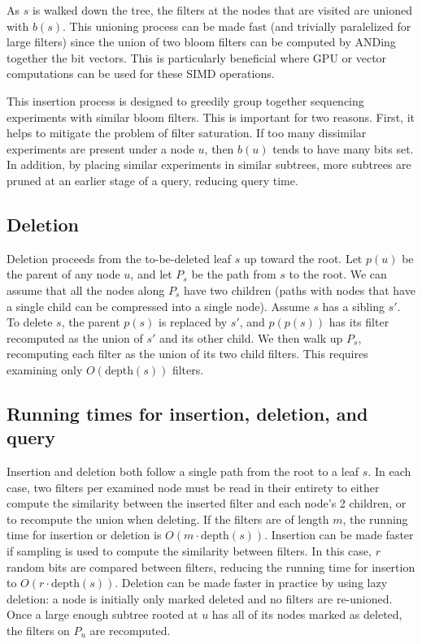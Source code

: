 \documentclass[11pt]{article}
\begin{document}
As $s$ is walked down the tree, the filters at the nodes that are visited are unioned with $b(s)$. This unioning process can be made fast (and trivially paralelized for large filters) since the union of two bloom filters can be computed by ANDing together the bit vectors. This is particularly beneficial where GPU or vector computations can be used for these SIMD operations. 

This insertion process is designed to greedily group together sequencing experiments with similar bloom filters. This is important for two reasons. First, it helps to mitigate the problem of filter saturation. If too many dissimilar experiments are present under a node $u$, then $b(u)$ tends to have many bits set. In addition, by placing similar experiments in similar subtrees, more subtrees are pruned at an earlier stage of a query, reducing query time.

\subsection{Deletion}

Deletion proceeds from the to-be-deleted leaf $s$ up toward the root. Let $p(u)$ be the parent of any node $u$, and let $P_s$ be the path from $s$ to the root. We can assume that all the nodes along $P_s$ have two children (paths with nodes that have a single child can be compressed into a single node).  Assume  $s$ has a sibling $s'$. To delete $s$, the parent $p(s)$ is replaced by $s'$, and $p(p(s))$ has its filter recomputed as the union of $s'$ and its other child. We then walk up $P_s$, recomputing each filter as the union of its two child filters. This requires examining only $O(\text{depth}(s))$ filters. 

\subsection{Running times for insertion, deletion, and query}

Insertion and deletion both follow a single path from the root to a leaf $s$. In each case, two filters per examined node must be read in their entirety to either compute the similarity between the inserted filter and each node's 2 children, or to recompute the union when deleting. If the filters are of length $m$, the running time for insertion or deletion is $O(m\cdot\text{depth}(s))$.  Insertion can be made faster if sampling is used to compute the similarity between filters. In this case, $r$ random bits are compared between filters, reducing the running time for insertion to $O(r\cdot\text{depth}(s))$. Deletion can be made faster in practice by using lazy deletion: a node is initially only marked deleted and no filters are re-unioned. Once a large enough subtree rooted at $u$ has all of its nodes marked as deleted, the filters on $P_u$ are recomputed. 
\end{document}
